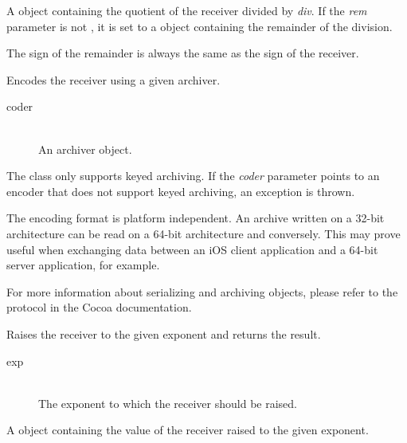 A  object containing the quotient of the receiver divided by \emph{div}. If the \emph{rem} parameter is not , it is set to a  object containing the remainder of the division.

The sign of the remainder is always the same as the sign of the receiver.



Encodes the receiver using a given archiver.


\docparams

\begin{description}
\item[coder] \hfill \\ An archiver object.
\end{description}

\docdiscuss

The  class only supports keyed archiving. If the \emph{coder} parameter points to an encoder that does not support keyed archiving, an exception is thrown.

The encoding format is platform independent. An archive written on a 32-bit architecture can be read on a 64-bit architecture and conversely. This may prove useful when exchanging data between an iOS client application and a 64-bit server application, for example.

For more information about serializing and archiving objects, please refer to the  protocol in the Cocoa documentation.



Raises the receiver to the given exponent and returns the result.


\docparams

\begin{description}
\item[exp] \hfill \\ The exponent to which the receiver should be raised.
\end{description}

\docretval

A  object containing the value of the receiver raised to the given exponent.

